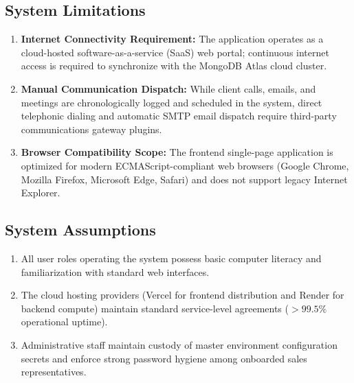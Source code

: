 \subsection{System Limitations}
\begin{enumerate}
    \item \textbf{Internet Connectivity Requirement:} The application operates as a cloud-hosted software-as-a-service (SaaS) web portal; continuous internet access is required to synchronize with the MongoDB Atlas cloud cluster.
    \item \textbf{Manual Communication Dispatch:} While client calls, emails, and meetings are chronologically logged and scheduled in the system, direct telephonic dialing and automatic SMTP email dispatch require third-party communications gateway plugins.
    \item \textbf{Browser Compatibility Scope:} The frontend single-page application is optimized for modern ECMAScript-compliant web browsers (Google Chrome, Mozilla Firefox, Microsoft Edge, Safari) and does not support legacy Internet Explorer.
\end{enumerate}

\subsection{System Assumptions}
\begin{enumerate}
    \item All user roles operating the system possess basic computer literacy and familiarization with standard web interfaces.
    \item The cloud hosting providers (Vercel for frontend distribution and Render for backend compute) maintain standard service-level agreements ($>99.5\%$ operational uptime).
    \item Administrative staff maintain custody of master environment configuration secrets and enforce strong password hygiene among onboarded sales representatives.
\end{enumerate}
